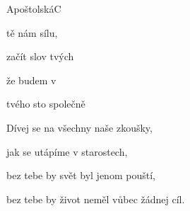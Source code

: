\begin{song}{Apoštolská}{C}{}

\begin{SBVerse}

  tě   nám  sílu, 

  začít  slov tvých   

  že  budem v 

 tvého sto  společně    

\end{SBVerse}

\begin{SBVerse}

Dívej se na všechny naše zkoušky,

jak se utápíme v starostech,

bez tebe by svět byl jenom pouští,

bez tebe by život neměl vůbec žádnej cíl.

\end{SBVerse}

\end{song}
